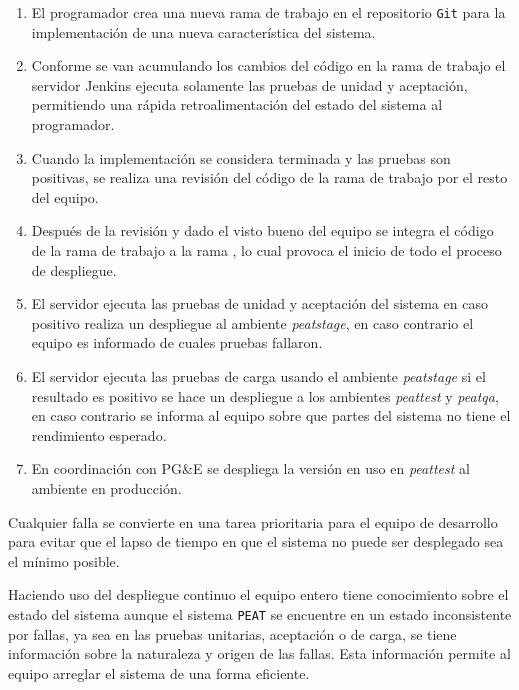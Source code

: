 \begin{enumerate}
\item El programador crea una nueva rama de trabajo en el repositorio \texttt{Git}
  para la implementación de una nueva característica del sistema.
\item Conforme se van acumulando los cambios del código en la rama de trabajo
  el servidor Jenkins ejecuta solamente las pruebas de unidad y aceptación,
  permitiendo una rápida retroalimentación del estado del sistema al programador.
\item Cuando la implementación se considera terminada y las pruebas son positivas,
  se realiza una revisión del código de la rama de trabajo por el resto del
  equipo.
\item Después de la revisión y dado el visto bueno del equipo se integra el
  código de la rama de trabajo a la rama , lo cual provoca el
  inicio de todo el proceso de despliegue.
\item El servidor ejecuta las pruebas de unidad y aceptación del sistema en
  caso positivo realiza un despliegue al ambiente \textit{peatstage}, en caso
  contrario el equipo es informado de cuales pruebas fallaron.
\item El servidor ejecuta las pruebas de carga usando el ambiente \textit{peatstage}
  si el resultado es positivo se hace un despliegue a los ambientes \textit{peattest}
  y \textit{peatqa}, en caso contrario se informa al equipo sobre que partes del
  sistema no tiene el rendimiento esperado.
\item En coordinación con PG\&E se despliega la versión en uso en \textit{peattest}
  al ambiente en producción.
\end{enumerate}

Cualquier falla se convierte en una tarea prioritaria para el equipo de desarrollo
para evitar que el lapso de tiempo en que el sistema no puede ser desplegado sea
el mínimo posible.

Haciendo uso del despliegue continuo el equipo entero tiene conocimiento sobre el
estado del sistema aunque el sistema \texttt{PEAT} se encuentre en un estado
inconsistente por fallas, ya sea en las pruebas unitarias, aceptación o de carga,
se tiene información sobre la naturaleza y origen de las fallas. Esta información
permite al equipo arreglar el sistema de una forma eficiente.
